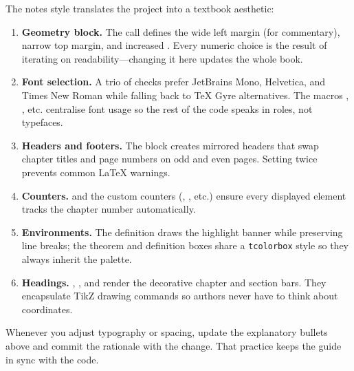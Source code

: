 The notes style translates the project into a textbook aesthetic:
\begin{enumerate}[leftmargin=2em]
  \item \textbf{Geometry block.} The \InlineMacro{\usepackage[...]{geometry}}
        call defines the wide left margin (for commentary), narrow top margin,
        and increased \InlineMacro{\marginparwidth}. Every numeric choice is the
        result of iterating on readability—changing it here updates the whole
        book.
  \item \textbf{Font selection.} A trio of \InlineMacro{\IfFontExistsTF} checks
        prefer JetBrains Mono, Helvetica, and Times New Roman while falling back
        to TeX Gyre alternatives. The macros \InlineMacro{\NotesFontBody},
        \InlineMacro{\NotesFontHeader}, etc. centralise font usage so the rest of
        the code speaks in roles, not typefaces.
  \item \textbf{Headers and footers.} The \InlineMacro{\pagestyle{fancy}} block
        creates mirrored headers that swap chapter titles and page numbers on odd
        and even pages. Setting \InlineMacro{\headheight} twice prevents common
        LaTeX warnings.
  \item \textbf{Counters.} \InlineMacro{\numberwithin} and the custom counters
        (, , etc.) ensure every
        displayed element tracks the chapter number automatically.
  \item \textbf{Environments.} The \InlineMacro{\begin{textexample}} definition
        draws the highlight banner while preserving line breaks; the theorem and
        definition boxes share a \texttt{tcolorbox} style so they always inherit
        the palette.
  \item \textbf{Headings.} \InlineMacro{\ChapterHeading}, \InlineMacro{\ContentsHeading},
        and \InlineMacro{\SectionBar} render the decorative chapter and section
        bars. They encapsulate TikZ drawing commands so authors never have to
        think about coordinates.
\end{enumerate}
Whenever you adjust typography or spacing, update the explanatory bullets above
and commit the rationale with the change. That practice keeps the guide in sync
with the code.

\label{sec:styles-homework}

